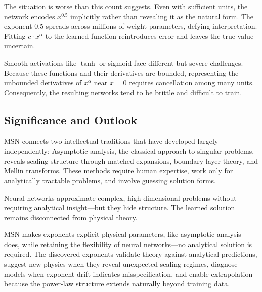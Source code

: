 \documentclass{article}
\theoremstyle{plain}
\theoremstyle{definition}
\theoremstyle{remark}
\begin{document}
The situation is worse than this count suggests. Even with sufficient units, the network encodes $x^{0.5}$ implicitly rather than revealing it as the natural form. The exponent 0.5 spreads across millions of weight parameters, defying interpretation. Fitting $c \cdot x^\alpha$ to the learned function reintroduces error and leaves the true value uncertain.

Smooth activations like $\tanh$ or sigmoid face different but severe challenges. Because these functions and their derivatives are bounded, representing the unbounded derivatives of $x^\alpha$ near $x=0$ requires cancellation among many units. Consequently, the resulting networks tend to be brittle and difficult to train.

\subsection{Significance and Outlook}

MSN connects two intellectual traditions that have developed largely independently: Asymptotic analysis, the classical approach to singular problems, reveals scaling structure through matched expansions, boundary layer theory, and Mellin transforms. These methods require human expertise, work only for analytically tractable problems, and involve guessing solution forms.

Neural networks approximate complex, high-dimensional problems without requiring analytical insight---but they hide structure. The learned solution remains disconnected from physical theory.

MSN makes exponents explicit physical parameters, like asymptotic analysis does, while retaining the flexibility of neural networks---no analytical solution is required. The discovered exponents validate theory against analytical predictions, suggest new physics when they reveal unexpected scaling regimes, diagnose models when exponent drift indicates misspecification, and enable extrapolation because the power-law structure extends naturally beyond training data.
\end{document}

